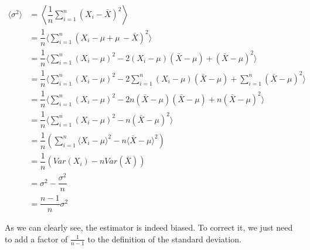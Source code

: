 \begin{align*}
    \langle \sigma^2 \rangle    &= \left\langle \dfrac{1}{n} \sum_{i=1}^n (X_i - \bar{X})^2 \right\rangle \\
                                &= \dfrac{1}{n} \langle  \sum_{i=1}^n (X_i - \mu + \mu \, - \bar{X})^2 \rangle \\ 
                                &= \dfrac{1}{n} \langle  \sum_{i=1}^n (X_i - \mu)^2 -2(X_i -\mu)(\bar{X} - \mu) + (\bar{X} - \mu)^2 \rangle \\
                                &= \dfrac{1}{n} \langle  \sum_{i=1}^n ( X_i - \mu)^2 -2 \sum_{i=1}^n (X_i -\mu)(\bar{X} - \mu) + \sum_{i=1}^n(\bar{X} - \mu)^2 \rangle  \\
                                &= \dfrac{1}{n} \langle  \sum_{i=1}^n ( X_i - \mu)^2 -2n(\bar{X} -\mu)(\bar{X} - \mu) + n(\bar{X} - \mu)^2 \rangle  \\
                                &= \dfrac{1}{n} \langle  \sum_{i=1}^n ( X_i - \mu)^2 -n(\bar{X} - \mu)^2 \rangle  \\
                                &= \dfrac{1}{n} \left( \sum_{i=1}^n \langle X_i - \mu \rangle^2 -n\langle\bar{X} -\mu \rangle^2 \right) \\
                                &= \dfrac{1}{n} \left( Var(X_i) -n Var(\bar{X})\right)  \\
                                &= \sigma^2 - \dfrac{\sigma^2}{n}   \\
                                &= \dfrac{n-1}{n} \sigma^2                               
\end{align*}

As we can clearly see, the estimator is indeed biased. To correct it, we just need to add a factor of $\frac{1}{n-1}$ to the definition of the standard deviation.

    